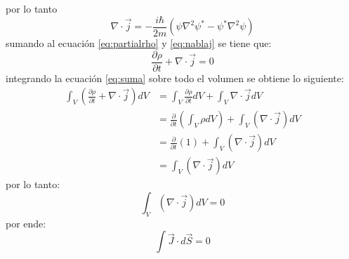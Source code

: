 \documentclass[12pt,letterpaper]{report}
\begin{document}
por lo tanto 
\begin{equation}
    \nabla \cdot \vec{j} = -\frac{i\hbar}{2m} (\psi \nabla^2 \psi^* - \psi^* \nabla^2 \psi)
    \label{eq:nablaj}
\end{equation}
sumando al ecuación \ref{eq:partialrho} y \ref{eq:nablaj} se tiene que:
\begin{equation}
    \frac{\partial \rho}{ \partial t}  + \nabla \cdot \vec{j} =0
    \label{eq:suma}
\end{equation}
integrando la ecuación \ref{eq:suma} sobre todo el volumen se obtiene lo siguiente:
\begin{align*}
    \int_V \left(\frac{\partial \rho}{ \partial t}  + \nabla \cdot \vec{j} \right) dV &= \int_V \frac{\partial \rho}{ \partial t}  dV+\int_V \nabla \cdot \vec{j} dV\\
    &=\frac{\partial}{\partial t}\left(\int_V \rho dV\right) +\int_V  (\nabla \cdot \vec{j} )dV\\
    &=\frac{\partial}{\partial t} \left(1 \right) + \int_V (\nabla \cdot \vec{j} )dV \\
    &= \int_V( \nabla \cdot \vec{j} )dV
\end{align*}
por lo tanto:
\begin{equation}
    \int_V( \nabla \cdot \vec{j} )dV = 0 
    \label{eq:intj}
\end{equation}
por ende:
\begin{equation}
    \int \vec{J} \cdot d\vec{S} = 0
\end{equation}
\end{document}
